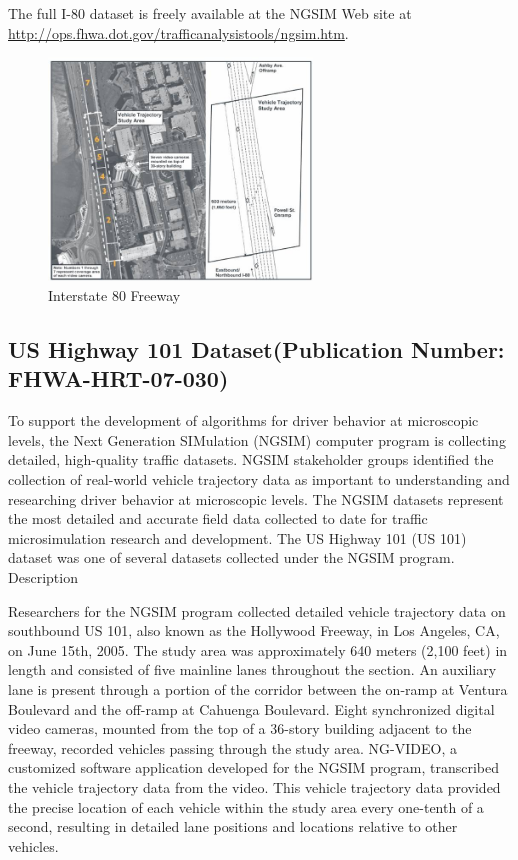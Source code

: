 The full I-80 dataset is freely available at the NGSIM Web site at \url{http://ops.fhwa.dot.gov/trafficanalysistools/ngsim.htm}.

\begin{figure}[H]
\begin{center}
\includegraphics[width=7cm]{./figures/image137b.jpg}
\caption{Interstate 80 Freeway}
\label{fig:pict_us80}
\end{center}
\end{figure}


\subsection{US Highway 101 Dataset(Publication Number: FHWA-HRT-07-030)}

To support the development of algorithms for driver behavior at microscopic levels, the Next Generation SIMulation (NGSIM) computer program is collecting detailed, high-quality traffic datasets. NGSIM stakeholder groups identified the collection of real-world vehicle trajectory data as important to understanding and researching driver behavior at microscopic levels. The NGSIM datasets represent the most detailed and accurate field data collected to date for traffic microsimulation research and development. The US Highway 101 (US 101) dataset was one of several datasets collected under the NGSIM program.
Description

Researchers for the NGSIM program collected detailed vehicle trajectory data on southbound US 101, also known as the Hollywood Freeway, in Los Angeles, CA, on June 15th, 2005. The study area was approximately 640 meters (2,100 feet) in length and consisted of five mainline lanes throughout the section. An auxiliary lane is present through a portion of the corridor between the on-ramp at Ventura Boulevard and the off-ramp at Cahuenga Boulevard. Eight synchronized digital video cameras, mounted from the top of a 36-story building adjacent to the freeway, recorded vehicles passing through the study area. NG-VIDEO, a customized software application developed for the NGSIM program, transcribed the vehicle trajectory data from the video. This vehicle trajectory data provided the precise location of each vehicle within the study area every one-tenth of a second, resulting in detailed lane positions and locations relative to other vehicles.


